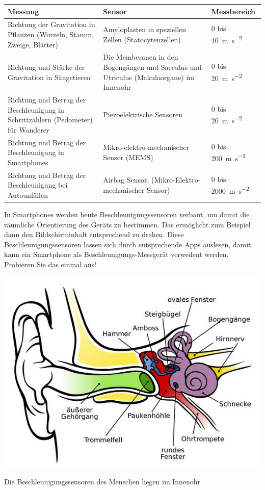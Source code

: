 \begin{table}
\begin{longtable}{@{} m{5cm} m{5cm} m{2cm} @{}}
\toprule
Messung & Sensor & Messbereich \\
\midrule
Richtung der Gravitation in Pflanzen (Wurzeln, Stamm, Zweige, Blätter) & Amyloplasten in speziellen Zellen (Statocytenzellen) & 0 bis \SI{10}{\metre \per \second \squared} \\
Richtung und Stärke der Gravitation in Säugetieren & Die Memberanen in den Bogengängen und Sacculus und Utriculus (Makulaorgane) im Innenohr & 0 bis \SI{20}{\metre \per \second \squared} \\
Richtung und Betrag der Beschleunigung in Schrittzählern (Pedometer) für Wanderer & Piezoelektrische Sensoren & 0 bis \SI{20}{\metre \per \second \squared} \\
Richtung und Betrag der Beschleunigung in Smartphones & Mikro-elektro-mechanischer Sensor (MEMS) & 0 bis \SI{200}{\metre \per \second \squared} \\
Richtung und Betrag der Beschleunigung bei Autounfällen & Airbag Sensor, (Mikro-Elektro-mechanischer Sensor) & 0 bis \SI{2000}{\metre \per \second \squared} \\
\bottomrule
\end{longtable}
\end{table}
In Smartphones werden heute Beschleunigungssensoren verbaut, um damit die räumliche Orientierung des Geräts zu bestimmen. Das ermöglicht zum Beispiel dann den Bildschirminhalt entsprechend zu drehen. Diese Beschleunigungssensoren lassen sich durch entsprechende Apps auslesen, damit kann ein Smartphone als Beschleunigungs-Messgerät verwedent werden. Probieren Sie das einmal aus! \newpage
\begin{marginfigure}
    \includegraphics[width=1\textwidth]{Bilder/innenohr.jpg}
    \caption{Die Beschleunigungssensoren des Menschen liegen im Innenohr}
\label{fig:innenohr}
\end{marginfigure}

